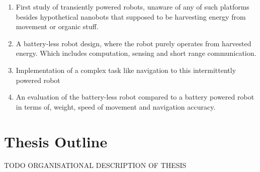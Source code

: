 \begin{enumerate}

\item First study of transiently powered robots, unaware of any of such platforms besides hypothetical nanobots that supposed to be harvesting energy from movement or organic stuff.

\item A battery-less robot design, where the robot purely operates from harvested energy. Which includes computation, sensing and short range communication.

\item Implementation of a complex task like navigation to this intermittently powered robot

\item An evaluation of the battery-less robot compared to a battery powered robot in terms of, weight, speed of movement and navigation accuracy.
\end{enumerate}


\section{Thesis Outline}


\vspace{1\baselineskip}

\noindent
TODO ORGANISATIONAL DESCRIPTION OF THESIS

